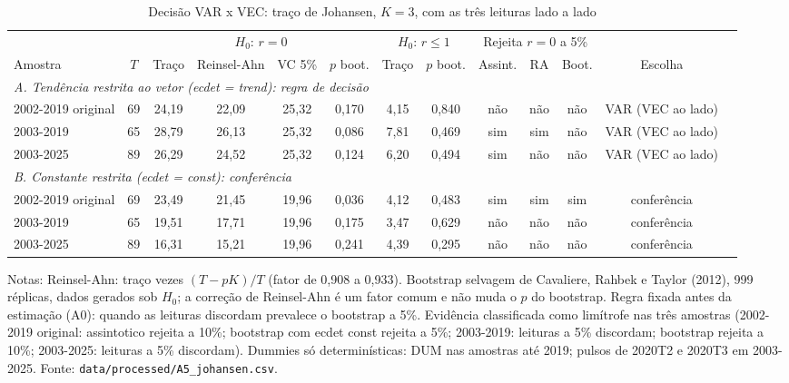 \begin{table}[htbp]
\centering
\caption{Decis\~ao VAR x VEC: tra\c{c}o de Johansen, $K = 3$, com as tr\^es leituras lado a lado}
\label{tab:a6_johansen}
\scriptsize
\begin{adjustbox}{max width=\linewidth}
\begin{tabular}{lcccccccccccl}
\toprule
& & \multicolumn{4}{c}{$H_0$: $r = 0$} & \multicolumn{2}{c}{$H_0$: $r \le 1$} & \multicolumn{3}{c}{Rejeita $r=0$ a 5\%} & \\
\cmidrule(lr){3-6}\cmidrule(lr){7-8}\cmidrule(lr){9-11}
Amostra & $T$ & Tra\c{c}o & Reinsel-Ahn & VC 5\% & $p$ boot. & Tra\c{c}o & $p$ boot. & Assint. & RA & Boot. & Escolha \\
\midrule
\multicolumn{12}{l}{\textit{A. Tend\^encia restrita ao vetor (ecdet = trend): regra de decis\~ao}} \\
2002-2019 original & 69 & 24{,}19 & 22{,}09 & 25{,}32 & 0{,}170 & 4{,}15 & 0{,}840 & n\~ao & n\~ao & n\~ao & VAR (VEC ao lado) \\
2003-2019 & 65 & 28{,}79 & 26{,}13 & 25{,}32 & 0{,}086 & 7{,}81 & 0{,}469 & sim & sim & n\~ao & VAR (VEC ao lado) \\
2003-2025 & 89 & 26{,}29 & 24{,}52 & 25{,}32 & 0{,}124 & 6{,}20 & 0{,}494 & sim & n\~ao & n\~ao & VAR (VEC ao lado) \\
\multicolumn{12}{l}{\textit{B. Constante restrita (ecdet = const): confer\^encia}} \\
2002-2019 original & 69 & 23{,}49 & 21{,}45 & 19{,}96 & 0{,}036 & 4{,}12 & 0{,}483 & sim & sim & sim & confer\^encia \\
2003-2019 & 65 & 19{,}51 & 17{,}71 & 19{,}96 & 0{,}175 & 3{,}47 & 0{,}629 & n\~ao & n\~ao & n\~ao & confer\^encia \\
2003-2025 & 89 & 16{,}31 & 15{,}21 & 19{,}96 & 0{,}241 & 4{,}39 & 0{,}295 & n\~ao & n\~ao & n\~ao & confer\^encia \\
\bottomrule
\end{tabular}
\end{adjustbox}
\begin{minipage}{0.97\linewidth}\footnotesize
\medskip Notas: Reinsel-Ahn: tra\c{c}o vezes $(T - pK)/T$ (fator de 0{,}908 a 0{,}933). Bootstrap selvagem de Cavaliere, Rahbek e Taylor (2012), 999 r\'eplicas, dados gerados sob $H_0$; a corre\c{c}\~ao de Reinsel-Ahn \'e um fator comum e n\~ao muda o $p$ do bootstrap. Regra fixada antes da estima\c{c}\~ao (A0): quando as leituras discordam prevalece o bootstrap a 5\%. Evid\^encia classificada como lim\'itrofe nas tr\^es amostras (2002-2019 original: assintotico rejeita a 10\%; bootstrap com ecdet const rejeita a 5\%; 2003-2019: leituras a 5\% discordam; bootstrap rejeita a 10\%; 2003-2025: leituras a 5\% discordam). Dummies s\'o determin\'isticas: DUM nas amostras at\'e 2019; pulsos de 2020T2 e 2020T3 em 2003-2025. Fonte: \texttt{data/processed/A5\_johansen.csv}.
\end{minipage}
\end{table}

